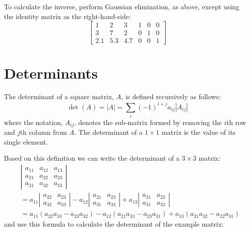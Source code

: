 \documentclass{article}
\begin{document}
To calculate the inverse, perform Gaussian elimination, as above, except
using the identity matrix as the right-hand-side:
\begin{equation}
	\left [ \begin{array}{ccc|ccc}
			1 & 2 & 3 & 1 & 0 & 0 \\
			3 & 7 & 2 & 0 & 1 & 0 \\
			2.1 & 5.3 & 4.7 & 0 & 0 & 1
	\end{array} \right ]
\end{equation}

\section{Determinants}

The determinant of a square matrix, $A$, is defined recursively as follows:
\begin{equation}
	\det (A) = | A | = \sum_i (-1)^{i+j} a_{ij} | A_{ij} |
\end{equation}
where the notation, $A_{ij}$,
denotes the sub-matrix formed by removing the $i$th row and $j$th column
from $A$. 
The determinant of a $1\times 1$ matrix is the value of its single element.

Based on this definition we can write the determinant of a $3 \times 3$ matrix:
\begin{eqnarray}
	& \left | \begin{array}{ccc}
		a_{11} & a_{12} & a_{13} \\
		a_{21} & a_{22} & a_{23} \\
		a_{31} & a_{32} & a_{33}
	\end{array} \right | \\ \nonumber
	& = a_{11} 
	\left | \begin{array}{cc} a_{22} & a_{23} \\
	a_{32} & a_{33} \end{array} \right |
	- a_{12} 
	\left | \begin{array}{cc} a_{21} & a_{23} \\
	a_{31} & a_{33} \end{array} \right |
	+ a_{13}
	\left | \begin{array}{cc} a_{21} & a_{22} \\
	a_{31} & a_{32} \end{array} \right | \\ \nonumber
	       & = a_{11} (a_{22} a_{33} - a_{23} a_{32})
	- a_{12} (a_{21} a_{33} - a_{23} a_{31})
	+ a_{13} (a_{21} a_{32} - a_{22} a_{31})
\end{eqnarray}
and use this formula to calculate the determinant of the example matrix:
\end{document}

